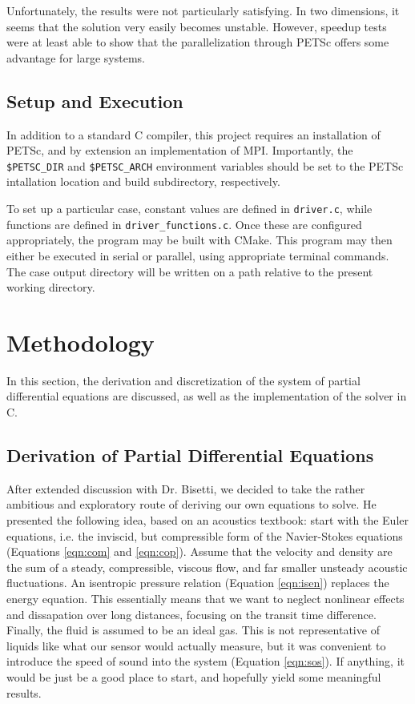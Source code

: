 \documentclass{article}
\begin{document}
Unfortunately, the results were not particularly satisfying. In two dimensions, it seems that the solution very easily becomes unstable. However, speedup tests were at least able to show that the parallelization through PETSc offers some advantage for large systems.

\subsection{Setup and Execution}

In addition to a standard C compiler, this project requires an installation of PETSc, and by extension an implementation of MPI. Importantly, the \verb|$PETSC_DIR| and \verb|$PETSC_ARCH| environment variables should be set to the PETSc intallation location and build subdirectory, respectively.

To set up a particular case, constant values are defined in \verb|driver.c|, while functions are defined in \verb|driver_functions.c|. Once these are configured appropriately, the program may be built with CMake. This program may then either be executed in serial or parallel, using appropriate terminal commands. The case output directory will be written on a path relative to the present working directory.

\section{Methodology}

In this section, the derivation and discretization of the system of partial differential equations are discussed, as well as the implementation of the solver in C.

\subsection{Derivation of Partial Differential Equations}

After extended discussion with Dr. Bisetti, we decided to take the rather ambitious and exploratory route of deriving our own equations to solve. He presented the following idea, based on an acoustics textbook: start with the Euler equations, i.e. the inviscid, but compressible form of the Navier-Stokes equations (Equations \ref{eqn:com} and \ref{eqn:cop}). Assume that the velocity and density are the sum of a steady, compressible, viscous flow, and far smaller unsteady acoustic fluctuations. An isentropic pressure relation (Equation \ref{eqn:isen}) replaces the energy equation. This essentially means that we want to neglect nonlinear effects and dissapation over long distances, focusing on the transit time difference. Finally, the fluid is assumed to be an ideal gas. This is not representative of liquids like what our sensor would actually measure, but it was convenient to introduce the speed of sound into the system (Equation \ref{eqn:sos}). If anything, it would be just be a good place to start, and hopefully yield some meaningful results.
\end{document}
